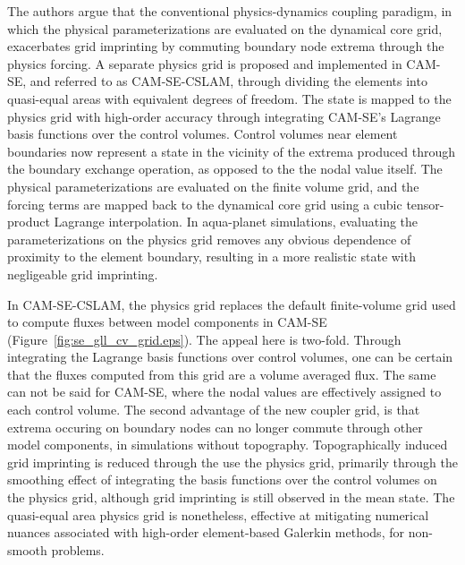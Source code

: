 \documentclass[twocol]{ametsoc}
\begin{document}
The authors argue that the conventional physics-dynamics coupling paradigm, in which the physical parameterizations are evaluated on the dynamical core grid, exacerbates grid imprinting by commuting boundary node extrema through the physics forcing. A separate physics grid is proposed and implemented in CAM-SE, and referred to as CAM-SE-CSLAM, through dividing the elements into quasi-equal areas with equivalent degrees of freedom. The state is mapped to the physics grid with high-order accuracy through integrating CAM-SE's Lagrange basis functions over the control volumes. Control volumes near element boundaries now represent a state in the vicinity of the extrema produced through the boundary exchange operation, as opposed to the the nodal value itself. The physical parameterizations are evaluated on the finite volume grid, and the forcing terms are mapped back to the dynamical core grid using a cubic tensor-product Lagrange interpolation. {\color{red}{The mapping procedures do not conserve total energy, nor axial angular momentum, but energy and AAM diagnostics indicate that these errors are negligeable.}} In aqua-planet simulations, evaluating the parameterizations on the physics grid removes any obvious dependence of proximity to the element boundary, resulting in a more realistic state with negligeable grid imprinting.


In CAM-SE-CSLAM, the physics grid replaces the default finite-volume grid used to compute fluxes between model components in CAM-SE (Figure~\ref{fig:se_gll_cv_grid.eps}). The appeal here is two-fold. Through integrating the Lagrange basis functions over control volumes, one can be certain that the fluxes computed from this grid are a volume averaged flux. The same can not be said for CAM-SE, where the nodal values are effectively assigned to each control volume. The second advantage of the new coupler grid, is that extrema occuring on boundary nodes can no longer commute through other model components, in simulations without topography. Topographically induced grid imprinting is reduced through the use the physics grid, primarily through the smoothing effect of integrating the basis functions over the control volumes on the physics grid, although grid imprinting is still observed in the mean state. The quasi-equal area physics grid is nonetheless, effective at mitigating numerical nuances associated with high-order element-based Galerkin methods, for non-smooth problems.  
\end{document}
